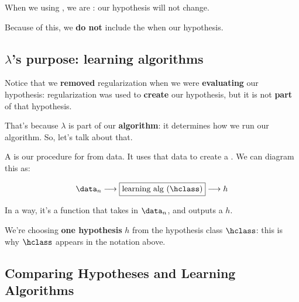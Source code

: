         \begin{clarification}
            When we  using , we are : our hypothesis will not change.
            
            Because of this, we \textbf{do not} include the  when  our hypothesis.
        \end{clarification}
        
    \subsection{$\lambda$'s purpose: learning algorithms}
    
        Notice that we \textbf{removed} regularization when we were \textbf{evaluating} our hypothesis: regularization was used to \textbf{create} our hypothesis, but it is not \textbf{part} of that hypothesis.
        
        That's because $\lambda$ is part of our \textbf{algorithm}: it determines how we run our algorithm. So, let's talk about that.\\
        
        \begin{definition}
            A  is our procedure for  from data. It uses that data to create a . We can diagram this as:
            
            \begin{equation*}
                \data_n \longrightarrow 
                \boxed{\text{learning alg ($\hclass$)}} 
                \longrightarrow h
            \end{equation*}
            
            In a way, it's a function that takes in  $\data_n$, and outputs a  $h$.
        \end{definition}
        
        We're choosing \textbf{one hypothesis} $h$ from the hypothesis class $\hclass$: this is why $\hclass$ appears in the notation above.
        
    \subsection{Comparing Hypotheses and Learning Algorithms}
        

